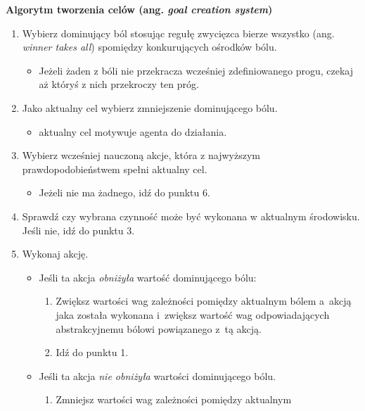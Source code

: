 \textbf{Algorytm tworzenia celów (ang. \textit{goal creation system})}
\begin{enumerate}
    \item Wybierz dominujący ból stosując regułę zwycięzca bierze wszystko 
        (ang. \textit{winner takes all}) spomiędzy konkurujących ośrodków bólu.
        \begin{itemize}
            \item Jeżeli żaden z bóli nie przekracza wcześniej zdefiniowanego 
                progu, czekaj aż któryś z nich przekroczy ten próg.
        \end{itemize}
    \item Jako aktualny cel wybierz zmniejszenie dominującego bólu.
        \begin{itemize}
            \item aktualny cel motywuje agenta do działania.
        \end{itemize}
    \item Wybierz wcześniej nauczoną akcje, która z najwyższym 
          prawdopodobieństwem spełni aktualny cel.
        \begin{itemize}
            \item Jeżeli nie ma żadnego, idź do punktu 6.
        \end{itemize}
    \item Sprawdź czy wybrana czynność może być wykonana w aktualnym środowisku. 
        Jeśli nie, idź do punktu 3.
    \item Wykonaj akcję.
        \begin{itemize}
            \item Jeśli ta akcja \textit{obniżyła} wartość dominującego bólu:
                \begin{enumerate}
                    \item Zwiększ wartości wag zależności pomiędzy aktualnym 
                        bólem a~akcją jaka została wykonana i~zwiększ wartość 
                        wag odpowiadających abstrakcyjnemu bólowi powiązanego 
                        z~tą akcją.
                    \item Idź do punktu 1.
                \end{enumerate}
            \item Jeśli ta akcja \textit{nie obniżyła} wartości dominującego bólu.
                \begin{enumerate}
                    \item Zmniejsz wartości wag zależności pomiędzy aktualnym 

\end{enumerate}
\end{itemize}
\end{enumerate}
